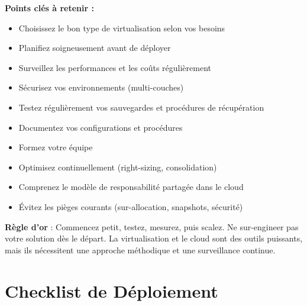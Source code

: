 \documentclass[11pt,a4paper]{article}
\begin{document}
\textbf{Points clés à retenir :}
\begin{itemize}
    \item Choisissez le bon type de virtualisation selon vos besoins
    \item Planifiez soigneusement avant de déployer
    \item Surveillez les performances et les coûts régulièrement
    \item Sécurisez vos environnements (multi-couches)
    \item Testez régulièrement vos sauvegardes et procédures de récupération
    \item Documentez vos configurations et procédures
    \item Formez votre équipe
    \item Optimisez continuellement (right-sizing, consolidation)
    \item Comprenez le modèle de responsabilité partagée dans le cloud
    \item Évitez les pièges courants (sur-allocation, snapshots, sécurité)
\end{itemize}

\begin{importantbox}
\textbf{Règle d'or} : Commencez petit, testez, mesurez, puis scalez. Ne sur-engineer pas votre solution dès le départ. La virtualisation et le cloud sont des outils puissants, mais ils nécessitent une approche méthodique et une surveillance continue.
\end{importantbox}

\section{Checklist de Déploiement}
\end{document}

